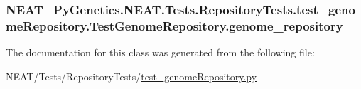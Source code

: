 \subsubsection[{\texorpdfstring{genome\+\_\+repository}{genome_repository}}]{\setlength{\rightskip}{0pt plus 5cm}N\+E\+A\+T\+\_\+\+Py\+Genetics.\+N\+E\+A\+T.\+Tests.\+Repository\+Tests.\+test\+\_\+genome\+Repository.\+Test\+Genome\+Repository.\+genome\+\_\+repository}\hypertarget{classNEAT__PyGenetics_1_1NEAT_1_1Tests_1_1RepositoryTests_1_1test__genomeRepository_1_1TestGenomeRepository_af758f0a978c4639ead0e8f5f9c6112e9}{}\label{classNEAT__PyGenetics_1_1NEAT_1_1Tests_1_1RepositoryTests_1_1test__genomeRepository_1_1TestGenomeRepository_af758f0a978c4639ead0e8f5f9c6112e9}


The documentation for this class was generated from the following file\+:\begin{DoxyCompactItemize}
\item 
N\+E\+A\+T/\+Tests/\+Repository\+Tests/\hyperlink{test__genomeRepository_8py}{test\+\_\+genome\+Repository.\+py}\end{DoxyCompactItemize}

